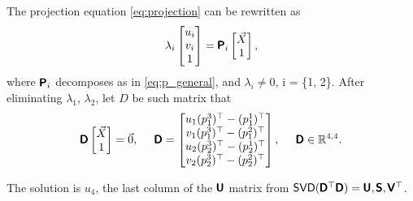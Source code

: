 The projection equation \eqref{eq:projection} can be rewritten as
\begin{equation}
    \lambda_i \begin{bmatrix} 
        u_i \\ v_i \\ 1 \end{bmatrix} = \pmb{\mathsf{P}}_i
    \begin{bmatrix} \vec{X} \\ 1
    \end{bmatrix},
\end{equation} 
where $\pmb{\mathsf{P}}_i$ decomposes as in \eqref{eq:p_general}, and $\lambda_i \neq 0$, i = \{1, 2\}.
After eliminating $\lambda_1$, $\lambda_2$, let $D$ be such matrix that
\begin{equation}
    \pmb{\mathsf{D}} \begin{bmatrix} \vec{X} \\ 1 \end{bmatrix} = \vec{0}, \;\;\;\;\;
    \pmb{\mathsf{D}} = \begin{bmatrix}
        u_1 (p_1^3)^\top - (p_1^1)^\top \\
        v_1 (p_1^3)^\top - (p_1^2)^\top \\
        u_2 (p_2^3)^\top - (p_2^1)^\top \\
        v_2 (p_2^3)^\top - (p_2^2)^\top \\
    \end{bmatrix}, \;\;\;\;\; \pmb{\mathsf{D}} \in \mathbb{R}^{4, 4}.
\end{equation}

The solution is $u_4$, the last column of the $\pmb{\mathsf{U}}$ matrix from $\mathsf{SVD}(\pmb{\mathsf{D}}^\top \pmb{\mathsf{D}}) = \pmb{\mathsf{U}}, \pmb{\mathsf{S}}, \pmb{\mathsf{V}}^\top$.



